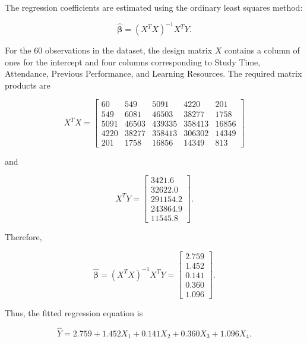The regression coefficients are estimated using the ordinary least squares method:

\begin{equation}
\hat{\boldsymbol{\beta}}
=
(X^{T}X)^{-1}X^{T}Y.
\end{equation}

For the 60 observations in the dataset, the design matrix $X$ contains a column of ones for the intercept and four columns corresponding to Study Time, Attendance, Previous Performance, and Learning Resources. The required matrix products are

\begin{equation}
X^{T}X =
\begin{bmatrix}
60 & 549 & 5091 & 4220 & 201\\
549 & 6081 & 46503 & 38277 & 1758\\
5091 & 46503 & 439335 & 358413 & 16856\\
4220 & 38277 & 358413 & 306302 & 14349\\
201 & 1758 & 16856 & 14349 & 813
\end{bmatrix}
\end{equation}

and

\begin{equation}
X^{T}Y =
\begin{bmatrix}
3421.6\\
32622.0\\
291154.2\\
243864.9\\
11545.8
\end{bmatrix}.
\end{equation}

Therefore,

\begin{equation}
\hat{\boldsymbol{\beta}}
=
(X^{T}X)^{-1}X^{T}Y
=
\begin{bmatrix}
2.759\\
1.452\\
0.141\\
0.360\\
1.096
\end{bmatrix}.
\end{equation}

Thus, the fitted regression equation is

\begin{equation}
\widehat{Y}
=
2.759
+1.452X_1
+0.141X_2
+0.360X_3
+1.096X_4.
\end{equation}

